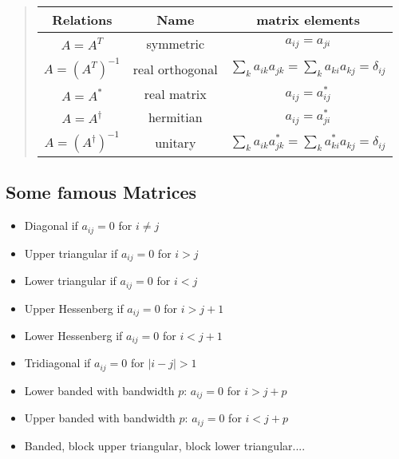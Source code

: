 \documentclass[%
oneside,                 %
final,                   %
10pt]{article}
\begin{document}
\begin{quote}
\begin{tabular}{ccc}
\hline
\multicolumn{1}{c}{ Relations } & \multicolumn{1}{c}{ Name } & \multicolumn{1}{c}{ matrix elements } \\
\hline
$A = A^{T}$                            & symmetric       & $a_{ij} = a_{ji}$                                                       \\
$A = \left (A^{T} \right )^{-1}$       & real orthogonal & $\sum_k a_{ik} a_{jk} = \sum_k a_{ki} a_{kj} = \delta_{ij}$             \\
$A = A^{ * }$                          & real matrix     & $a_{ij} = a_{ij}^{ * }$                                                 \\
$A = A^{\dagger}$                      & hermitian       & $a_{ij} = a_{ji}^{ * }$                                                 \\
$A = \left (A^{\dagger} \right )^{-1}$ & unitary         & $\sum_k a_{ik} a_{jk}^{ * } = \sum_k a_{ki}^{ * } a_{kj} = \delta_{ij}$ \\
\hline
\end{tabular}
\end{quote}

\noindent




\subsection*{Some famous Matrices}

\begin{itemize}
  \item Diagonal if $a_{ij}=0$ for $i\ne j$

  \item Upper triangular if $a_{ij}=0$ for $i > j$

  \item Lower triangular if $a_{ij}=0$ for $i < j$

  \item Upper Hessenberg if $a_{ij}=0$ for $i > j+1$

  \item Lower Hessenberg if $a_{ij}=0$ for $i < j+1$

  \item Tridiagonal if $a_{ij}=0$ for $|i -j| > 1$

  \item Lower banded with bandwidth $p$: $a_{ij}=0$ for $i > j+p$

  \item Upper banded with bandwidth $p$: $a_{ij}=0$ for $i < j+p$

  \item Banded, block upper triangular, block lower triangular....
\end{itemize}
\end{document}
